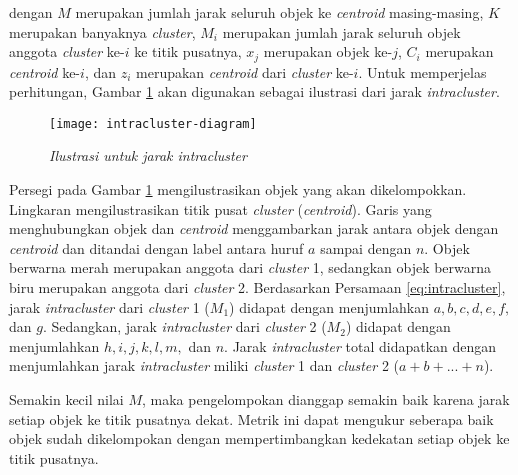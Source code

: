 dengan $M$ merupakan jumlah jarak seluruh objek ke \textit{centroid} masing-masing, $K$ merupakan banyaknya \textit{cluster}, $M_i$ merupakan jumlah jarak seluruh objek anggota \textit{cluster} ke-$i$ ke titik pusatnya, $x_j$ merupakan objek ke-$j$, $C_i$ merupakan \textit{centroid} ke-$i$, dan $z_i$ merupakan \textit{centroid} dari \textit{cluster} ke-$i$. Untuk memperjelas perhitungan, Gambar \ref{fig:intracluster} akan digunakan sebagai ilustrasi dari jarak \textit{intracluster}.

\begin{figure}[h]
	\begin{center}
		\texttt{[image: intracluster-diagram]}
		\caption{\textit{Ilustrasi untuk jarak \textit{intracluster}}}
		\label{fig:intracluster}
	\end{center}
\end{figure}

Persegi pada Gambar \ref{fig:intracluster} mengilustrasikan objek yang akan dikelompokkan. Lingkaran mengilustrasikan titik pusat \textit{cluster} (\textit{centroid}). Garis yang menghubungkan objek dan \textit{centroid} menggambarkan jarak antara objek dengan \textit{centroid} dan ditandai dengan label antara huruf $a$ sampai dengan $n$. Objek berwarna merah merupakan anggota dari \textit{cluster} 1, sedangkan objek berwarna biru merupakan anggota dari \textit{cluster} 2. Berdasarkan Persamaan \ref{eq:intracluster}, jarak \textit{intracluster} dari \textit{cluster} 1 ($M_1$) didapat dengan menjumlahkan $a, b, c, d, e, f,$ dan $g$. Sedangkan, jarak \textit{intracluster} dari \textit{cluster} 2 ($M_2$) didapat dengan menjumlahkan $h, i, j, k, l, m,$ dan $n$. Jarak \textit{intracluster} total didapatkan dengan menjumlahkan jarak \textit{intracluster} miliki \textit{cluster} 1 dan \textit{cluster} 2 ($a + b + ... + n$).

Semakin kecil nilai $M$, maka pengelompokan dianggap semakin baik karena jarak setiap objek ke titik pusatnya dekat. Metrik ini dapat mengukur seberapa baik objek sudah dikelompokan dengan mempertimbangkan kedekatan setiap objek ke titik pusatnya.
